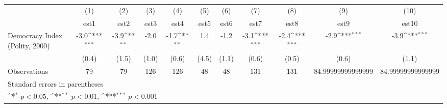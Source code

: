 {
\def\sym#1{\ifmmode^{#1}\else\(^{#1}\)\fi}
\begin{tabular}{l*{10}{c}}
\hline\hline
                    &\multicolumn{1}{c}{(1)}         &\multicolumn{1}{c}{(2)}         &\multicolumn{1}{c}{(3)}         &\multicolumn{1}{c}{(4)}         &\multicolumn{1}{c}{(5)}         &\multicolumn{1}{c}{(6)}         &\multicolumn{1}{c}{(7)}         &\multicolumn{1}{c}{(8)}         &\multicolumn{1}{c}{(9)}         &\multicolumn{1}{c}{(10)}         \\
                    &        est1         &        est2         &        est3         &        est4         &        est5         &        est6         &        est7         &        est8         &        est9         &       est10         \\
\hline
Democracy Index (Polity, 2000)&        -3.0\sym{***}&        -3.9\sym{**} &        -2.0         &        -1.7\sym{**} &         1.4         &        -1.2         &        -3.1\sym{***}&        -2.4\sym{***}&        -2.9\sym{***}&        -3.9\sym{***}\\
                    &       (0.4)         &       (1.5)         &       (1.0)         &       (0.6)         &       (4.5)         &       (1.1)         &       (0.6)         &       (0.5)         &       (0.6)         &       (1.1)         \\
\hline
Observations        &          79         &          79         &         126         &         126         &          48         &          48         &         131         &         131         &84.99999999999999         &84.99999999999999         \\
\hline\hline
\multicolumn{11}{l}{\footnotesize Standard errors in parentheses}\\
\multicolumn{11}{l}{\footnotesize \sym{*} \(p<0.05\), \sym{**} \(p<0.01\), \sym{***} \(p<0.001\)}\\
\end{tabular}
}

